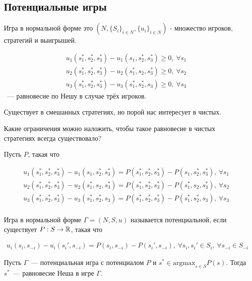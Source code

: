 \documentclass[../main.tex]{subfiles}
\begin{document}
\subsection{Потенциальные игры}

\begin{remrk}
	Игра в нормальной форме это $(N, \{S_i\}_{i \in N}, \{u_i\}_{i \in N})$ - множество игроков, стратегий и выигрышей.

	\begin{align*}
		u_1(s_1^*, s_2^*, s_3^*) - u_1(s_1, s_2^*, s_3^*) \geqslant 0, \ \forall s_1 \\
		u_2(s_1^*, s_2^*, s_3^*) - u_2(s_1^*, s_2, s_3^*) \geqslant 0, \ \forall s_2 \\
		u_3(s_1^*, s_2^*, s_3^*) - u_3(s_1^*, s_2^*, s_3) \geqslant 0, \ \forall s_3
	\end{align*} ~--- равновесие по Нешу в случае трёх игроков.

	Существует в смешанных стратегиях, но порой нас интересует в чистых.

	Какие ограничения можно наложить, чтобы такое равновесие в чистых стратегиях всегда существовало?


\end{remrk}


Пусть $P$, такая что 

\begin{align*}
	u_1(s_1^*, s_2^*, s_3^*) - u_1(s_1, s_2^*, s_3^*) = P(s_1^*, s_2^*, s_3^*) - P(s_1, s_2^*, s_3^*), \ \forall s_1 \\
	u_2(s_1^*, s_2^*, s_3^*) - u_2(s_1^*, s_2, s_3^*) = P(s_1^*, s_2^*, s_3^*) - P(s_1^*, s_2, s_3^*), \ \forall s_2 \\
	u_3(s_1^*, s_2^*, s_3^*) - u_3(s_1^*, s_2^*, s_3) = P(s_1^*, s_2^*, s_3^*) - P(s_1^*, s_2^*, s_3), \ \forall s_3 \\
\end{align*}

\begin{df}
  Игра в нормальной форме $\Gamma = (N, S, u)$ называется потенциальной, если существует $P : S \to \mathbb{R}$, такая что 

	\begin{align*}
		u_i(s_i, s_{-i}) - u_i(s_i', s_{-i}) = P(s_i, s_{-i}) - P(s_i', s_{-i}), \ \forall s_i, s_i' \in S_i, \ \forall s_{-i} \in S_{-i}
	\end{align*}

\end{df}

\begin{claim}
  \label{claim:equlibrim_in_potential_games}
	Пусть $\Gamma$~--- потенциальная игра с потенциалом $P$ и $s^* \in \text{argmax}_{s \in S} P(s)$.
	Тогда  $s^*$~--- равновесие Неша в игре $\Gamma$. 
\end{claim}
\end{document}
